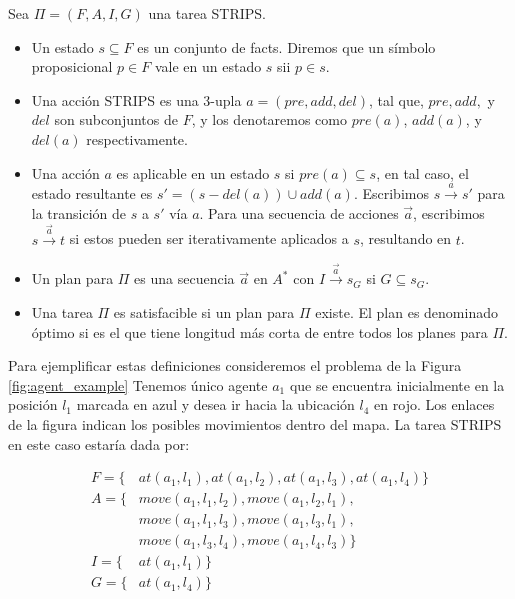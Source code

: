 \begin{mydef}
    Sea $\Pi = (F, A, I, G)$ una tarea STRIPS.
    
    \begin{itemize}
        \item Un estado $s \subseteq F$ es un conjunto de facts. Diremos que un
        símbolo proposicional $p \in F$ vale en un estado $s$ sii $p \in s$.
        
        \item Una acción STRIPS es una 3-upla $a = (pre, add, del)$, tal que,
        $pre, add,$ y $del$ son subconjuntos de $F$, y los denotaremos como
        $pre(a)$, $add(a)$, y $del(a)$ respectivamente.

        \item Una acción $a$ es aplicable en un estado $s$ si $pre(a) \subseteq
        s$, en tal caso, el estado resultante es $s' = (s - del(a)) \cup
        add(a)$. Escribimos $s \xrightarrow{a} s'$ para la transición de $s$ a
        $s'$ vía $a$. Para una secuencia de acciones $\vec{a}$, escribimos $s
        \xrightarrow{\vec{a}} t$ si estos pueden ser iterativamente aplicados a
        $s$, resultando en $t$.

        \item Un plan para $\Pi$ es una secuencia $\vec{a}$ en $A^{*}$ con $I
        \xrightarrow{\vec{a}} s_G$ si $G \subseteq s_G$.
        
        \item Una tarea $\Pi$ es satisfacible si un plan para $\Pi$ existe. El
        plan es denominado óptimo si es el que tiene longitud más corta de entre
        todos los planes para $\Pi$.
    \end{itemize}
\end{mydef}

Para ejemplificar estas definiciones consideremos el problema de la Figura
\ref{fig:agent_example} Tenemos único agente $a_1$ que se encuentra inicialmente
en la posición $l_1$ marcada en azul y desea ir hacia la ubicación $l_4$ en
rojo. Los enlaces de la figura indican los posibles movimientos dentro del mapa.
La tarea STRIPS en este caso estaría dada por:

\begin{align*}
    F = \{&at(a_1, l_1), at(a_1, l_2), at(a_1, l_3), at(a_1, l_4)\} \\
    A = \{&move(a_1, l_1, l_2), move(a_1, l_2, l_1), \\
    & move(a_1, l_1, l_3), move(a_1, l_3, l_1),\\
    & move(a_1, l_3, l_4), move(a_1, l_4, l_3)\} \\
    I = \{&at(a_1, l_1)\} \\
    G = \{&at(a_1, l_4)\}
\end{align*}

